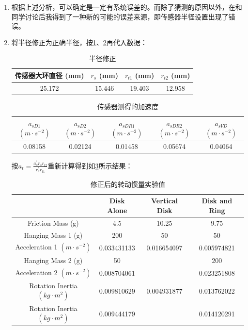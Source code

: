 \documentclass[dvipsnames, svgnames,a4paper,11pt]{article}
\begin{document}
	\begin{enumerate}
		\item 根据上述分析，可以确定是一定有系统误差的。而除了猜测的原因以外，在和同学讨论后我得到了一种新的可能的误差来源，即传感器半径设置出现了错误。
		\item 将半径修正为正确半径，按\cref{tab:tab8}、\cref{tab:tab9}再代入数据：
		
		\begin{table}[h]
			\centering
			\caption{半径修正}
			\begin{tabular}{|c|c|c|c|}
				\hline
				传感器大环直径 (mm) & $r_s$ (mm) & $r_{t1}$ (mm) & $r_{t2}$ (mm) \\
				\hline
				25.172 & 15.446 & 19.403 & 12.958 \\
				\hline
			\end{tabular}
			\label{tab:tab8}
		\end{table}
		
		\begin{table}[h]
			\centering
			\caption{传感器测得的加速度}
			\begin{tabular}{|c|c|c|c|c|}
				\hline
				 $a_{sD1}$ $(m\cdot s^{-2})$ & $a_{sD2}$ $(m\cdot s^{-2})$ & $a_{sDR1}$ $(m\cdot s^{-2})$ & $a_{sDR2}$ $(m\cdot s^{-2})$ & $a_{sVD}$ $(m\cdot s^{-2})$ \\
				\hline
				0.08158 & 0.02124 & 0.01458 & 0.05674 & 0.04064 \\
				\hline
			\end{tabular}
			\label{tab:tab9}
		\end{table}
		
		按$a_t=\frac{a_s^{'}r_sr_{t2}}{r_s^{'}r_{t1}}$重新计算得到如\cref{tab:tab10}所示结果：
		
		\begin{table}[h]
			\centering
			\caption{修正后的转动惯量实验值}
			\begin{tabular}{|c|c|c|c|}
				\hline
				& Disk Alone & Vertical Disk & Disk and Ring \\
				\hline
				Friction Mass (g) & 4.5 & 10.25 & 9.75 \\
				\hline
				Hanging Mass 1 (g) & 200 & 50 & 50 \\
				\hline
				Acceleration 1 $(m\cdot s^{-2})$ & 0.033431133 & 0.016654097 & 0.005974821 \\
				\hline
				Hanging Mass 2 (g) & 50 & & 200 \\
				\hline
				Acceleration 2 $(m\cdot s^{-2})$ & 0.008704061 & & 0.023251808 \\
				\hline
				Rotation Inertia $(kg\cdot m^2)$ & 0.009810629 & 0.004931877 & 0.013762022 \\
				\hline
				Rotation Inertia $(kg\cdot m^2)$ & 0.009444179 & & 0.014120291 \\
				\hline
			\end{tabular}
			\label{tab:tab10}
		\end{table}
		

\end{enumerate}
\end{document}
